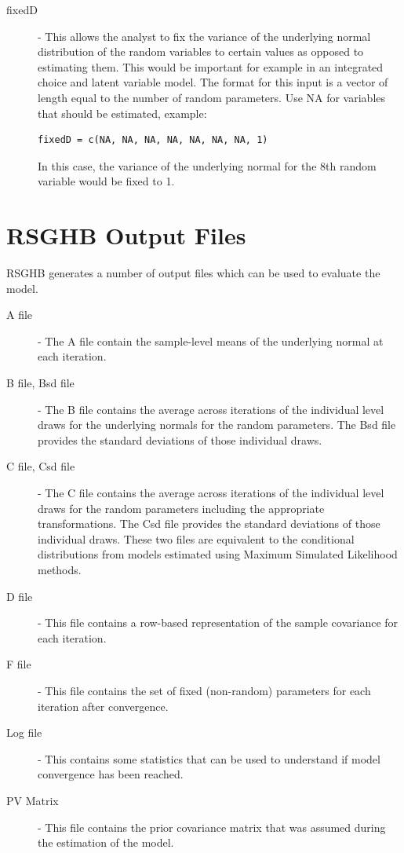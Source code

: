 \documentclass{article}
\begin{document}
\begin{description}
\item[fixedD] - This allows the analyst to fix the variance of the underlying normal distribution of the random variables to certain values as opposed to estimating them. This would be important for example in an integrated choice and latent variable model. The format for this input is a vector of length equal to the number of random parameters. Use NA for variables that should be estimated, example:
 \begin{verbatim}fixedD = c(NA, NA, NA, NA, NA, NA, NA, 1)\end{verbatim} In this case, the variance of the underlying normal for the 8th random variable would be fixed to 1.

\end{description}     

\section*{RSGHB Output Files}

RSGHB generates a number of output files which can be used to evaluate the model.

\begin{description}

\item[A file] - The A file contain the sample-level means of the underlying normal at each iteration. 

\item[B file, Bsd file] - The B file contains the average across iterations of the individual level draws for the underlying normals for the random parameters. The Bsd file provides the standard deviations of those individual draws. 

\item[C file, Csd file] - The C file contains the average across iterations of the individual level draws for the random parameters including the appropriate transformations. The Csd file provides the standard deviations of those individual draws. These two files are equivalent to the conditional distributions from models estimated using Maximum Simulated Likelihood methods.

\item[D file] - This file contains a row-based representation of the sample covariance for each iteration.

\item[F file] - This file contains the set of fixed (non-random) parameters for each iteration after convergence.

\item[Log file] - This contains some statistics that can be used to understand if model convergence has been reached.

\item[PV Matrix] - This file contains the prior covariance matrix that was assumed during the estimation of the model.

\end{description}  
\end{document}
